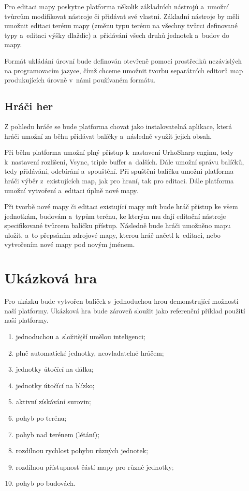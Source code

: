 Pro editaci mapy poskytne platforma několik základních nástrojů a~umožní tvůrcům modifikovat nástroje či přidávat své vlastní. Základní nástroje by měli umožnit editaci terénu mapy (změnu typu terénu na všechny tvůrci definované typy a~editaci výšky dlaždic) a~přidávání všech druhů jednotek a~budov do mapy.

Formát ukládání úrovní bude definován otevřeně pomocí prostředků nezávislých na programovacím jazyce, čímž chceme umožnit tvorbu separátních editorů map produkujících úrovně v~námi používaném formátu.

\subsection{Hráči her}
Z pohledu hráče se bude platforma chovat jako instalovatelná aplikace, která hráči umožní za běhu přidávat balíčky a~následně využít jejich obsah.

Při běhu platforma umožní plný přístup k~nastavení UrhoSharp enginu, tedy k~nastavení rozlišení, Vsync, triple buffer a~dalších. Dále umožní správu balíčků, tedy přidávání, odebírání a~spouštění. Při spuštění balíčku umožní platforma hráči výběr z~existujících map, jak pro hraní, tak pro editaci. Dále platforma umožní vytvoření a~editaci úplně nové mapy.

Při tvorbě nové mapy či editaci existující mapy mít bude hráč přístup ke všem jednotkám, budovám a~typům terénu, ke kterým mu dají editační nástroje specifikované tvůrcem balíčku přístup. Následně bude hráči umožněno mapu uložit, a~to přepsáním zdrojové mapy, kterou hráč načetl k~editaci, nebo vytvořením nové mapy pod novým jménem.

\section{Ukázková hra}
\label{sec:showcasedef}

Pro ukázku bude vytvořen balíček s~jednoduchou hrou demonstrující možnosti naší platformy. Ukázková hra bude zároveň sloužit jako referenční příklad použití naší platformy.

\begin{enumerate}
	\item jednoduchou a~složitější umělou inteligenci;
	\item plně automatické jednotky, neovladatelné hráčem;
	\item jednotky útočící na dálku;
	\item jednotky útočící na blízko;
	\item aktivní získávání surovin;
	\item pohyb po terénu;
	\item pohyb nad terénem (létání);
	\item rozdílnou rychlost pohybu různých jednotek;
	\item rozdílnou přístupnost částí mapy pro různé jednotky;
	\item pohyb po budovách.
\end{enumerate}

